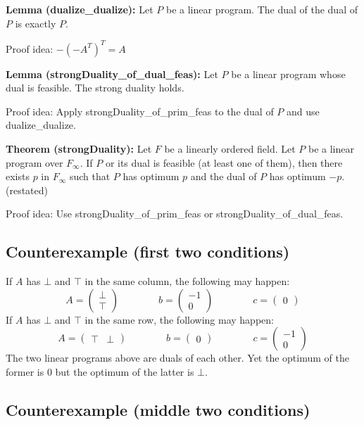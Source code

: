 \documentclass[]{article}
\renewcommand{\.}{\hskip .75pt}
\begin{document}
\medskip \noindent
\textbf{Lemma (dualize\_dualize):}
Let $P$ be a linear program. The dual of the dual of $P$ is exactly $P$.

\medskip \noindent
Proof idea:
$ -(-A^T)^T = A $

\medskip \noindent
\textbf{Lemma (strongDuality\_of\_dual\_feas):}
Let $P$ be a linear program whose dual is feasible.
The strong duality holds.

\medskip \noindent
Proof idea:
Apply strongDuality\_of\_prim\_feas to the dual of $P$ and
use dualize\_dualize.

\medskip \noindent
\textbf{Theorem (strongDuality):}
Let $F$ be a linearly ordered field.
Let $P$ be a linear program over $F_\infty$.
If $P$ or its dual is feasible (at least one of them),
then there exists $p$ in $F_\infty$ such that
$P$ has optimum $p$ and the dual of $P$ has optimum $-p$.
(restated)

\medskip \noindent
Proof idea:
Use strongDuality\_of\_prim\_feas or strongDuality\_of\_dual\_feas.

\subsection{Counterexample (first two conditions)}

If $A$ has $\bot$ and $\top$ in the same column, the following may happen:
$$
A = \begin{pmatrix} \bot \\ \top \end{pmatrix}
\qquad \qquad
b = \begin{pmatrix} -1 \\ 0 \end{pmatrix}
\qquad \qquad
c = \begin{pmatrix} 0 \end{pmatrix}
$$
If $A$ has $\bot$ and $\top$ in the same row, the following may happen:
$$
A = \begin{pmatrix} \top & \bot \end{pmatrix}
\qquad \qquad
b = \begin{pmatrix} 0 \end{pmatrix}
\qquad \qquad
c = \begin{pmatrix} -1 \\ 0 \end{pmatrix}
$$
The two linear programs above are duals of each other.
Yet the optimum of the former is $0$
but the optimum of the latter is $\bot$.

\subsection{Counterexample (middle two conditions)}
\end{document}
